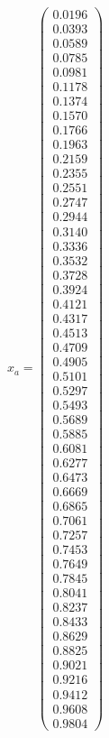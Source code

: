 \documentclass{udpreport}
\begin{document}
\begin{enumerate}
\begin{enumerate}
{{{{ 	        $x_{a} = \left(\begin{array}{c} 0.0196\\ 0.0393\\ 0.0589\\ 0.0785\\ 0.0981\\ 0.1178\\ 0.1374\\ 0.1570\\ 0.1766\\ 0.1963\\ 0.2159\\ 0.2355\\ 0.2551\\ 0.2747\\ 0.2944\\ 0.3140\\ 0.3336\\ 0.3532\\ 0.3728\\ 0.3924\\ 0.4121\\ 0.4317\\ 0.4513\\ 0.4709\\ 0.4905\\ 0.5101\\ 0.5297\\ 0.5493\\ 0.5689\\ 0.5885\\ 0.6081\\ 0.6277\\ 0.6473\\ 0.6669\\ 0.6865\\ 0.7061\\ 0.7257\\ 0.7453\\ 0.7649\\ 0.7845\\ 0.8041\\ 0.8237\\ 0.8433\\ 0.8629\\ 0.8825\\ 0.9021\\ 0.9216\\ 0.9412\\ 0.9608\\ 0.9804 \end{array}\right)$
 	        
}}}}
\end{enumerate}
\end{enumerate}
\end{document}
